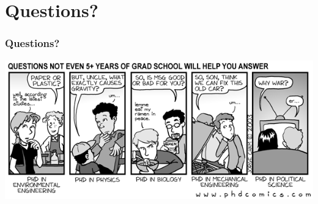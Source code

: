 \documentclass{beamer}
\begin{document}
\section{Questions?} %

\begin{frame} %
 \frametitle{Questions?}
 \includegraphics[width=\textwidth]{./img/questions.png}
\end{frame}
\end{document}
